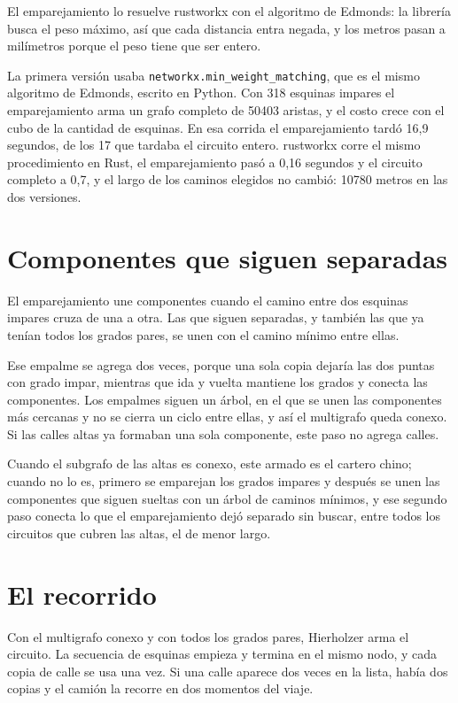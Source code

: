 \documentclass[12pt,a4paper]{report}
\begin{document}
El emparejamiento lo resuelve rustworkx con el algoritmo de Edmonds: la librería busca el peso máximo, así que cada distancia entra negada, y los metros pasan a milímetros porque el peso tiene que ser entero.

La primera versión usaba \texttt{networkx.min\_weight\_matching}, que es el mismo algoritmo de Edmonds, escrito en Python. Con 318 esquinas impares el emparejamiento arma un grafo completo de 50403 aristas, y el costo crece con el cubo de la cantidad de esquinas. En esa corrida el emparejamiento tardó 16,9 segundos, de los 17 que tardaba el circuito entero. rustworkx corre el mismo procedimiento en Rust, el emparejamiento pasó a 0,16 segundos y el circuito completo a 0,7, y el largo de los caminos elegidos no cambió: 10780 metros en las dos versiones.

\section{Componentes que siguen separadas}

El emparejamiento une componentes cuando el camino entre dos esquinas impares cruza de una a otra. Las que siguen separadas, y también las que ya tenían todos los grados pares, se unen con el camino mínimo entre ellas.

Ese empalme se agrega dos veces, porque una sola copia dejaría las dos puntas con grado impar, mientras que ida y vuelta mantiene los grados y conecta las componentes. Los empalmes siguen un árbol, en el que se unen las componentes más cercanas y no se cierra un ciclo entre ellas, y así el multigrafo queda conexo. Si las calles altas ya formaban una sola componente, este paso no agrega calles.

Cuando el subgrafo de las altas es conexo, este armado es el cartero chino; cuando no lo es, primero se emparejan los grados impares y después se unen las componentes que siguen sueltas con un árbol de caminos mínimos, y ese segundo paso conecta lo que el emparejamiento dejó separado sin buscar, entre todos los circuitos que cubren las altas, el de menor largo.


\section{El recorrido}

Con el multigrafo conexo y con todos los grados pares, Hierholzer arma el circuito. La secuencia de esquinas empieza y termina en el mismo nodo, y cada copia de calle se usa una vez. Si una calle aparece dos veces en la lista, había dos copias y el camión la recorre en dos momentos del viaje.
\end{document}
